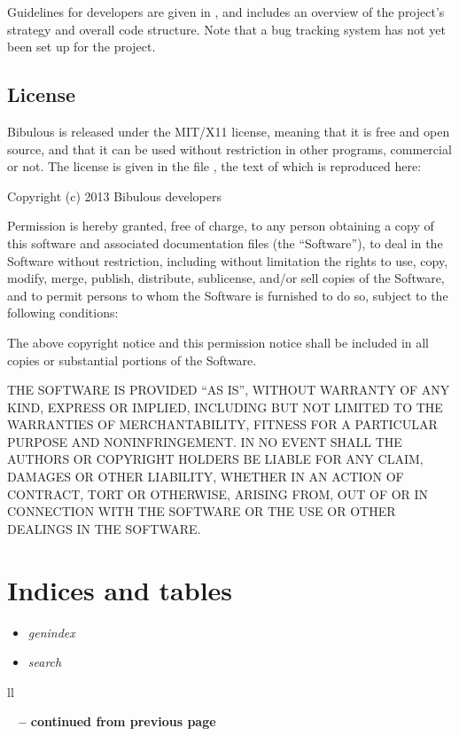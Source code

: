 \documentclass[letterpaper,10pt,english]{sphinxmanual}
\begin{document}
Guidelines for developers are given in , and includes an overview of the project's strategy and overall code structure. Note that a bug tracking system has not yet been set up for the project.


\section{License}
\label{index:license}
Bibulous is released under the MIT/X11 license, meaning that it is free and open source, and that it can be used without restriction in other programs, commercial or not. The license is given in the file , the text of which is reproduced here:

Copyright (c) 2013 Bibulous developers

Permission is hereby granted, free of charge, to any person obtaining a copy of this software and
associated documentation files (the ``Software''), to deal in the Software without restriction,
including without limitation the rights to use, copy, modify, merge, publish, distribute,
sublicense, and/or sell copies of the Software, and to permit persons to whom the Software is
furnished to do so, subject to the following conditions:

The above copyright notice and this permission notice shall be included in all copies or
substantial portions of the Software.

THE SOFTWARE IS PROVIDED ``AS IS'', WITHOUT WARRANTY OF ANY KIND, EXPRESS OR IMPLIED, INCLUDING BUT
NOT LIMITED TO THE WARRANTIES OF MERCHANTABILITY, FITNESS FOR A PARTICULAR PURPOSE AND
NONINFRINGEMENT. IN NO EVENT SHALL THE AUTHORS OR COPYRIGHT HOLDERS BE LIABLE FOR ANY CLAIM,
DAMAGES OR OTHER LIABILITY, WHETHER IN AN ACTION OF CONTRACT, TORT OR OTHERWISE, ARISING FROM, OUT
OF OR IN CONNECTION WITH THE SOFTWARE OR THE USE OR OTHER DEALINGS IN THE SOFTWARE.


\chapter{Indices and tables}
\label{index:indices-and-tables}\begin{itemize}
\item {} 
\emph{genindex}

\item {} 
\emph{search}

\end{itemize}

\begin{longtable}{ll}
\hline
\endfirsthead

%
{{\bfseries \tablename\ \thetable{} -- continued from previous page}} \\
\hline
\endhead

\hline {} \\ \hline
\endfoot

\hline
\endlastfoot

\end{longtable}




\renewcommand{\indexname}{Index}
\printindex
\end{document}
